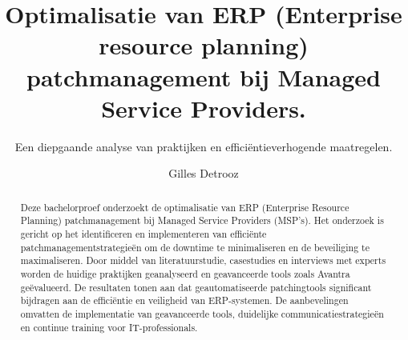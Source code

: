 \documentclass[a0,portrait]{hogent-poster}
\title{Optimalisatie van ERP (Enterprise resource planning) patchmanagement bij Managed Service Providers.}
\subtitle{Een diepgaande analyse van praktijken en efficiëntieverhogende maatregelen.}
\author{Gilles Detrooz}
\begin{document}
\maketitle

\begin{abstract}
  Deze bachelorproef onderzoekt de optimalisatie van ERP (Enterprise Resource Planning) patchmanagement bij Managed Service Providers (MSP's). Het onderzoek is gericht op het identificeren en implementeren van efficiënte patchmanagementstrategieën om de downtime te minimaliseren en de beveiliging te maximaliseren. Door middel van literatuurstudie, casestudies en interviews met experts worden de huidige praktijken geanalyseerd en geavanceerde tools zoals Avantra geëvalueerd. De resultaten tonen aan dat geautomatiseerde patchingtools significant bijdragen aan de efficiëntie en veiligheid van ERP-systemen. De aanbevelingen omvatten de implementatie van geavanceerde tools, duidelijke communicatiestrategieën en continue training voor IT-professionals.
\end{abstract}
\end{document}
